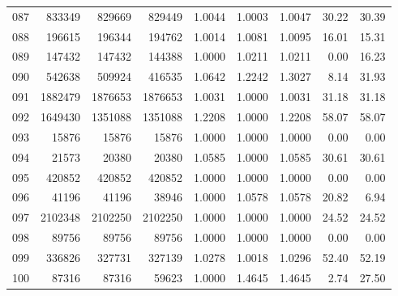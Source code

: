 \begin{longtable}{crrrrrrrr}
087 & 833349 & 829669 & 829449 & 1.0044 & 1.0003 & 1.0047 & 30.22 & 30.39 \\
088 & 196615 & 196344 & 194762 & 1.0014 & 1.0081 & 1.0095 & 16.01 & 15.31 \\
089 & 147432 & 147432 & 144388 & 1.0000 & 1.0211 & 1.0211 & 0.00 & 16.23 \\
090 & 542638 & 509924 & 416535 & 1.0642 & 1.2242 & 1.3027 & 8.14 & 31.93 \\
091 & 1882479 & 1876653 & 1876653 & 1.0031 & 1.0000 & 1.0031 & 31.18 & 31.18 \\
092 & 1649430 & 1351088 & 1351088 & 1.2208 & 1.0000 & 1.2208 & 58.07 & 58.07 \\
093 & 15876 & 15876 & 15876 & 1.0000 & 1.0000 & 1.0000 & 0.00 & 0.00 \\
094 & 21573 & 20380 & 20380 & 1.0585 & 1.0000 & 1.0585 & 30.61 & 30.61 \\
095 & 420852 & 420852 & 420852 & 1.0000 & 1.0000 & 1.0000 & 0.00 & 0.00 \\
096 & 41196 & 41196 & 38946 & 1.0000 & 1.0578 & 1.0578 & 20.82 & 6.94 \\
097 & 2102348 & 2102250 & 2102250 & 1.0000 & 1.0000 & 1.0000 & 24.52 & 24.52 \\
098 & 89756 & 89756 & 89756 & 1.0000 & 1.0000 & 1.0000 & 0.00 & 0.00 \\
099 & 336826 & 327731 & 327139 & 1.0278 & 1.0018 & 1.0296 & 52.40 & 52.19 \\
100 & 87316 & 87316 & 59623 & 1.0000 & 1.4645 & 1.4645 & 2.74 & 27.50 \\
\end{longtable}
